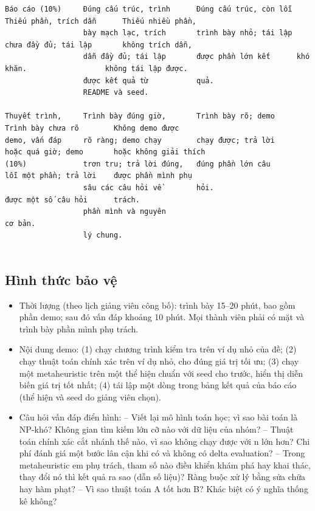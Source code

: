 \documentclass[a4paper,11pt]{article}
\begin{document}
\begin{Verbatim}[fontsize=\tiny,breaklines=true,breakanywhere=true]
Báo cáo (10%)     Đúng cấu trúc, trình      Đúng cấu trúc, còn lỗi Thiếu phần, trích dẫn      Thiếu nhiều phần,
                  bày mạch lạc, trích       trình bày nhỏ; tái lập chưa đầy đủ; tái lập       không trích dẫn,
                  dẫn đầy đủ; tái lập       được phần lớn kết      khó khăn.                  không tái lập được.
                  được kết quả từ           quả.
                  README và seed.

Thuyết trình,     Trình bày đúng giờ,       Trình bày rõ; demo       Trình bày chưa rõ        Không demo được
demo, vấn đáp     rõ ràng; demo chạy        chạy được; trả lời       hoặc quá giờ; demo       hoặc không giải thích
(10%)             trơn tru; trả lời đúng,   đúng phần lớn câu        lỗi một phần; trả lời    được phần mình phụ
                  sâu các câu hỏi về        hỏi.                     được một số câu hỏi      trách.
                  phần mình và nguyên                                cơ bản.
                  lý chung.


\end{Verbatim}
\subsection{Hình thức bảo vệ}
\begin{itemize}
\item Thời lượng (theo lịch giảng viên công bố): trình bày 15–20 phút, bao gồm phần demo; sau đó vấn đáp khoảng 10 phút. Mọi thành viên phải có mặt và trình bày phần mình phụ trách.
\item Nội dung demo: (1) chạy chương trình kiểm tra trên ví dụ nhỏ của đề; (2) chạy thuật toán chính xác trên ví dụ nhỏ, cho đúng giá trị tối ưu; (3) chạy một metaheuristic trên một thể hiện chuẩn với seed cho trước, hiển thị diễn biến giá trị tốt nhất; (4) tái lập một dòng trong bảng kết quả của báo cáo (thể hiện và seed do giảng viên chọn).
\item Câu hỏi vấn đáp điển hình: – Viết lại mô hình toán học; vì sao bài toán là NP-khó? Không gian tìm kiếm lớn cỡ nào với dữ liệu của nhóm? – Thuật toán chính xác cắt nhánh thế nào, vì sao không chạy được với n lớn hơn? Chi phí đánh giá một bước lân cận khi có và không có delta evaluation? – Trong metaheuristic em phụ trách, tham số nào điều khiển khám phá hay khai thác, thay đổi nó thì kết quả ra sao (dẫn số liệu)? Ràng buộc xử lý bằng sửa chữa hay hàm phạt? – Vì sao thuật toán A tốt hơn B? Khác biệt có ý nghĩa thống kê không?
\end{itemize}
\end{document}
